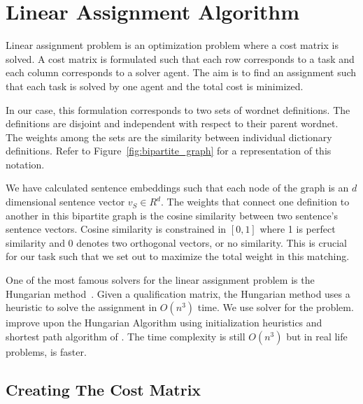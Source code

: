 \section{Linear Assignment Algorithm}%
\label{sec:linear_assignment_algorithm}

Linear assignment problem is an optimization problem where a cost matrix is solved.
A cost matrix is formulated such that each row corresponds to a task and each column corresponds to a solver agent.
The aim is to find an assignment such that each task is solved by one agent and the total cost is minimized.

In our case, this formulation corresponds to two sets of wordnet definitions.
The definitions are disjoint and independent with respect to their parent wordnet.
The weights among the sets are the similarity between individual dictionary definitions.
Refer to Figure~\ref{fig:bipartite_graph} for a representation of this notation.

We have calculated sentence embeddings such that each node of the graph is an $d$ dimensional sentence vector $v_S \in R^{d}$.
The weights that connect one definition to another in this bipartite graph is the cosine similarity between two sentence's sentence vectors.
Cosine similarity is constrained in $[0,1]$ where 1 is perfect similarity and 0 denotes two orthogonal vectors, or no similarity.
This is crucial for our task such that we set out to maximize the total weight in this matching.

One of the most famous solvers for the linear assignment problem is the Hungarian method~\cite{kuhn_hungarian_1955}.
Given a qualification matrix, the Hungarian method uses a heuristic to solve the assignment in $O(n^3)$ time.
We use \textcite{jonker_shortest_1987} solver for the problem.
\citeauthor{jonker_shortest_1987} improve upon the Hungarian Algorithm using initialization heuristics and shortest path algorithm of \textcite{dijkstra_note_1959}.
The time complexity is still $O(n^3)$ but in real life problems, \citeauthor{jonker_shortest_1987} is faster.

\subsection{Creating The Cost Matrix}%
\label{sub:creating_the_cost_matrix}

